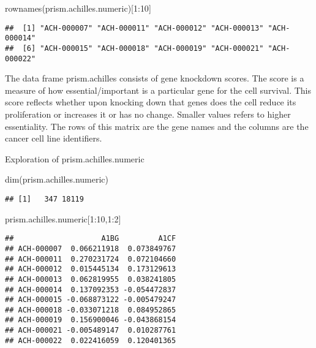 \documentclass[
]{article}
\newenvironment{Shaded}{\begin{snugshade}}{\end{snugshade}}
\newcommand{\DecValTok}[1]{\textcolor[rgb]{0.00,0.00,0.81}{#1}}
\newcommand{\FunctionTok}[1]{\textcolor[rgb]{0.00,0.00,0.00}{#1}}
\newcommand{\NormalTok}[1]{#1}
\newcommand{\SpecialCharTok}[1]{\textcolor[rgb]{0.00,0.00,0.00}{#1}}
\begin{document}
\begin{Shaded}
\begin{Highlighting}[]
\FunctionTok{rownames}\NormalTok{(prism.achilles.numeric)[}\DecValTok{1}\SpecialCharTok{:}\DecValTok{10}\NormalTok{]}
\end{Highlighting}
\end{Shaded}

\begin{verbatim}
##  [1] "ACH-000007" "ACH-000011" "ACH-000012" "ACH-000013" "ACH-000014"
##  [6] "ACH-000015" "ACH-000018" "ACH-000019" "ACH-000021" "ACH-000022"
\end{verbatim}

The data frame prism.achilles consists of gene knockdown scores. The
score is a measure of how essential/important is a particular gene for
the cell survival. This score reflects whether upon knocking down that
genes does the cell reduce its proliferation or increases it or has no
change. Smaller values refers to higher essentiality. The rows of this
matrix are the gene names and the columns are the cancer cell line
identifiers.

Exploration of prism.achilles.numeric

\begin{Shaded}
\begin{Highlighting}[]
\FunctionTok{dim}\NormalTok{(prism.achilles.numeric)}
\end{Highlighting}
\end{Shaded}

\begin{verbatim}
## [1]   347 18119
\end{verbatim}

\begin{Shaded}
\begin{Highlighting}[]
\NormalTok{prism.achilles.numeric[}\DecValTok{1}\SpecialCharTok{:}\DecValTok{10}\NormalTok{,}\DecValTok{1}\SpecialCharTok{:}\DecValTok{2}\NormalTok{]}
\end{Highlighting}
\end{Shaded}

\begin{verbatim}
##                    A1BG         A1CF
## ACH-000007  0.066211918  0.073849767
## ACH-000011  0.270231724  0.072104660
## ACH-000012  0.015445134  0.173129613
## ACH-000013  0.062819955  0.038241805
## ACH-000014  0.137092353 -0.054472837
## ACH-000015 -0.068873122 -0.005479247
## ACH-000018 -0.033071218  0.084952865
## ACH-000019  0.156900046 -0.043868154
## ACH-000021 -0.005489147  0.010287761
## ACH-000022  0.022416059  0.120401365
\end{verbatim}
\end{document}
